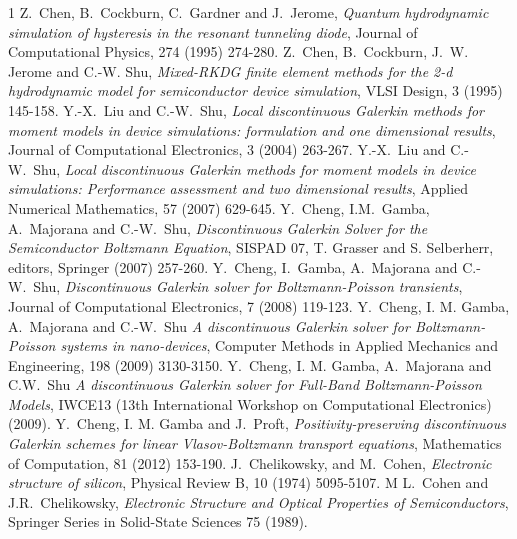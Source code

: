 \documentclass[11pt]{article}
\begin{document}
\begin{thebibliography}{1}
Z.~Chen, B.~Cockburn, C.~Gardner and J.~Jerome, 
\emph{Quantum hydrodynamic simulation of hysteresis in the resonant tunneling diode},  
Journal of Computational Physics, 274 (1995) 274-280.
%
Z.~Chen, B.~Cockburn, J.~W. Jerome and C.-W. Shu, 
\emph{Mixed-RKDG finite element me\-thods for the 2-d hydrodynamic model for semiconductor device 
simulation},
VLSI Design, 3 (1995) 145-158.
%
Y.-X.~Liu and C.-W.~Shu, 
\emph{Local discontinuous Galerkin methods for moment models in device simulations: formulation and 
one dimensional results}, 
Journal of Computational Electronics, 3 (2004) 263-267.
%
Y.-X.~Liu and C.-W.~Shu, 
\emph{Local discontinuous Galerkin methods for moment models in device simulations: Performance 
assessment and two dimensional results}, 
Applied Numerical Mathematics, 57 (2007) 629-645.
%
Y.~Cheng, I.M.~Gamba, A.~Majorana and C.-W.~Shu,
\emph{Discontinuous Galerkin Solver for the Semiconductor Boltzmann Equation}, 
SISPAD 07, T. Grasser and S. Selberherr, editors, Springer (2007) 257-260.
%
Y.~Cheng, I.~Gamba, A.~Majorana and C.-W.~Shu, 
\emph{Discontinuous {Galerkin} solver for {Boltzmann-Poisson} transients}, 
Journal of Computational Electronics, 7 (2008) 119-123.
%
Y.~Cheng, I. M. Gamba, A.~Majorana and C.-W.~Shu 
\emph{A discontinuous Galerkin solver for Boltzmann-Poisson systems in nano-devices}, 
Computer Methods in Applied Mechanics and Engineering,
198 (2009) 3130-3150.
%
Y.~Cheng, I. M. Gamba, A.~Majorana and C.W.~Shu 
\emph{A discontinuous Galerkin solver for Full-Band Boltzmann-Poisson Models},
IWCE13 (13th International Workshop on Computational Electronics) (2009).
%
Y.~Cheng, I. M. Gamba and J.~Proft, 
\emph{Positivity-preserving discontinuous Galerkin schemes for linear Vlasov-Boltzmann transport 
equations}, 
Mathematics of Computation, 81 (2012) 153-190. 
%
J.~Chelikowsky, and M.~Cohen, 
\emph{Electronic structure of silicon}, 
Physical Review B, 10 (1974) 5095-5107.
%
 M L.~Cohen and J.R.~Chelikowsky, 
\emph{Electronic Structure and Optical Properties of Semiconductors}, 
Springer Series in Solid-State Sciences 75 (1989).



\end{thebibliography}
\end{document}
